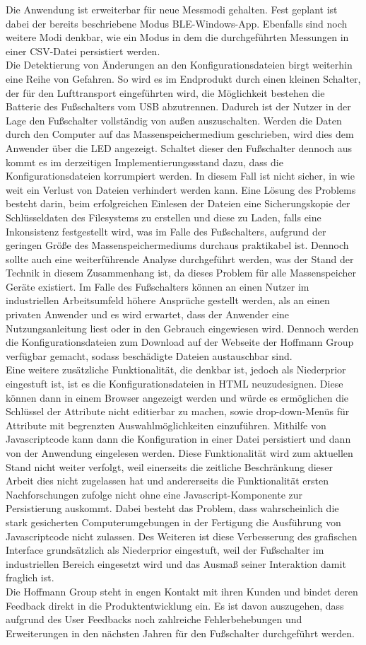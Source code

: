 Die Anwendung ist erweiterbar für neue Messmodi gehalten. Fest geplant ist dabei der bereits beschriebene Modus \ac{BLE}-Windows-App. Ebenfalls sind noch weitere Modi denkbar, wie ein Modus in dem die durchgeführten Messungen in einer \ac{CSV}-Datei persistiert werden.\\
Die Detektierung von Änderungen an den Konfigurationsdateien birgt weiterhin eine Reihe von Gefahren. So wird es im Endprodukt durch einen kleinen Schalter, der für den Lufttransport eingeführten wird, die Möglichkeit bestehen die Batterie des Fußschalters vom USB abzutrennen. Dadurch ist der Nutzer in der Lage den Fußschalter vollständig von außen auszuschalten. Werden die Daten durch den Computer auf das Massenspeichermedium geschrieben, wird dies dem Anwender über die LED angezeigt. Schaltet dieser den Fußschalter dennoch aus kommt es im derzeitigen Implementierungssstand dazu, dass die Konfigurationsdateien korrumpiert werden. In diesem Fall ist nicht sicher, in wie weit ein Verlust von Dateien verhindert werden kann. Eine Lösung des Problems besteht darin, beim erfolgreichen Einlesen der Dateien eine Sicherungskopie der Schlüsseldaten des Filesystems zu erstellen und diese zu Laden, falls eine Inkonsistenz festgestellt wird, was im Falle des Fußschalters, aufgrund der geringen Größe des Massenspeichermediums durchaus praktikabel ist. Dennoch sollte auch eine weiterführende Analyse durchgeführt werden, was der Stand der Technik in diesem Zusammenhang ist, da dieses Problem für alle Massenspeicher Geräte existiert. Im Falle des Fußschalters können an einen Nutzer im industriellen Arbeitsumfeld höhere Ansprüche gestellt werden, als an einen privaten Anwender und es wird erwartet, dass der Anwender eine Nutzungsanleitung liest oder in den Gebrauch eingewiesen wird. Dennoch werden die Konfigurationsdateien zum Download auf der Webseite der Hoffmann Group verfügbar gemacht, sodass beschädigte Dateien austauschbar sind.\\
Eine weitere zusätzliche Funktionalität, die denkbar ist, jedoch als Niederprior eingestuft ist, ist es die Konfigurationsdateien in \ac{HTML} neuzudesignen. Diese können dann in einem Browser angezeigt werden und würde es ermöglichen die Schlüssel der Attribute nicht editierbar zu machen, sowie drop-down-Menüs für Attribute mit begrenzten Auswahlmöglichkeiten einzuführen. Mithilfe von Javascriptcode kann dann die Konfiguration in einer Datei persistiert und dann von der Anwendung eingelesen werden. Diese Funktionalität wird zum aktuellen Stand nicht weiter verfolgt, weil einerseits die zeitliche Beschränkung dieser Arbeit dies nicht zugelassen hat und andererseits die Funktionalität ersten Nachforschungen zufolge nicht ohne eine Javascript-Komponente zur Persistierung auskommt. Dabei besteht das Problem, dass wahrscheinlich die stark gesicherten Computerumgebungen in der Fertigung die Ausführung von Javascriptcode nicht zulassen. Des Weiteren ist diese Verbesserung des grafischen Interface grundsätzlich als Niederprior eingestuft, weil der Fußschalter im industriellen Bereich eingesetzt wird und das Ausmaß seiner Interaktion damit fraglich ist.\\
Die Hoffmann Group steht in engen Kontakt mit ihren Kunden und bindet deren Feedback direkt in die Produktentwicklung ein. Es ist davon auszugehen, dass aufgrund des User Feedbacks noch zahlreiche Fehlerbehebungen und Erweiterungen in den nächsten Jahren für den Fußschalter durchgeführt werden.
